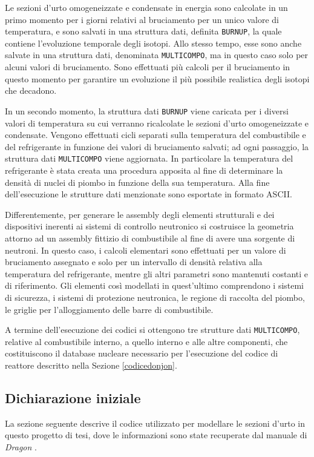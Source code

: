 Le sezioni d'urto omogeneizzate e condensate in energia sono calcolate in un 
primo momento per i giorni relativi al bruciamento
per un unico valore di temperatura, e sono salvati in una 
struttura dati, definita \texttt{BURNUP}, la quale contiene l'evoluzione 
temporale degli isotopi. Allo stesso tempo, esse sono anche salvate in una 
struttura dati, denominata \texttt{MULTICOMPO}, ma in questo caso solo per alcuni 
valori di bruciamento.
Sono effettuati più calcoli per il bruciamento in questo momento per garantire 
un
evoluzione il più possibile realistica degli isotopi che decadono.

In un secondo momento, la struttura dati \texttt{BURNUP} viene caricata per i 
diversi valori di temperatura su cui verranno ricalcolate le sezioni d'urto 
omogeneizzate e condensate.
Vengono effettuati cicli separati sulla temperatura del combustibile e del 
refrigerante
in funzione dei valori di bruciamento salvati; ad ogni passaggio, la struttura 
dati \texttt{MULTICOMPO} viene aggiornata.
In particolare la temperatura del refrigerante è stata creata una procedura 
apposita al fine di determinare la densità di nuclei di piombo in funzione della sua temperatura.  
Alla fine dell'esecuzione le strutture dati menzionate sono esportate in 
formato 
ASCII.

Differentemente, per generare le assembly degli elementi strutturali e dei 
dispositivi inerenti ai sistemi di controllo neutronico si costruisce la 
geometria attorno ad un assembly fittizio di combustibile al fine di avere una 
sorgente di neutroni.
In questo caso, i calcoli elementari sono effettuati per un valore di 
bruciamento assegnato e solo per un intervallo di densità relativa alla 
temperatura del refrigerante, 
mentre gli altri parametri sono mantenuti costanti e di riferimento. 
Gli elementi così modellati in quest'ultimo comprendono i sistemi di sicurezza, 
i sistemi di protezione neutronica, le regione di raccolta del piombo, le 
griglie per l'alloggiamento delle barre di combustibile. 

A termine dell'esecuzione dei codici si ottengono tre strutture dati 
\texttt{MULTICOMPO}, 
relative al combustibile interno, a quello interno e alle altre componenti,
che costituiscono il database nucleare necessario per l'esecuzione del codice 
di 
reattore descritto nella Sezione \ref{codicedonjon}.

\subsection{Dichiarazione iniziale}
La sezione seguente descrive il codice utilizzato per modellare le sezioni 
d'urto in questo progetto di tesi, dove le informazioni sono state recuperate 
dal manuale di \textit{Dragon} \cite{dragonman}.

